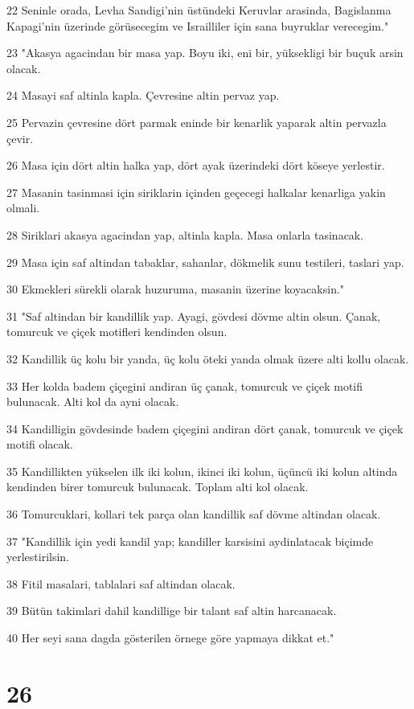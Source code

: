 \par 22 Seninle orada, Levha Sandigi'nin üstündeki Keruvlar arasinda, Bagislanma Kapagi'nin üzerinde görüsecegim ve Israilliler için sana buyruklar verecegim."
\par 23 "Akasya agacindan bir masa yap. Boyu iki, eni bir, yüksekligi bir buçuk arsin olacak.
\par 24 Masayi saf altinla kapla. Çevresine altin pervaz yap.
\par 25 Pervazin çevresine dört parmak eninde bir kenarlik yaparak altin pervazla çevir.
\par 26 Masa için dört altin halka yap, dört ayak üzerindeki dört köseye yerlestir.
\par 27 Masanin tasinmasi için siriklarin içinden geçecegi halkalar kenarliga yakin olmali.
\par 28 Siriklari akasya agacindan yap, altinla kapla. Masa onlarla tasinacak.
\par 29 Masa için saf altindan tabaklar, sahanlar, dökmelik sunu testileri, taslari yap.
\par 30 Ekmekleri sürekli olarak huzuruma, masanin üzerine koyacaksin."
\par 31 "Saf altindan bir kandillik yap. Ayagi, gövdesi dövme altin olsun. Çanak, tomurcuk ve çiçek motifleri kendinden olsun.
\par 32 Kandillik üç kolu bir yanda, üç kolu öteki yanda olmak üzere alti kollu olacak.
\par 33 Her kolda badem çiçegini andiran üç çanak, tomurcuk ve çiçek motifi bulunacak. Alti kol da ayni olacak.
\par 34 Kandilligin gövdesinde badem çiçegini andiran dört çanak, tomurcuk ve çiçek motifi olacak.
\par 35 Kandillikten yükselen ilk iki kolun, ikinci iki kolun, üçüncü iki kolun altinda kendinden birer tomurcuk bulunacak. Toplam alti kol olacak.
\par 36 Tomurcuklari, kollari tek parça olan kandillik saf dövme altindan olacak.
\par 37 "Kandillik için yedi kandil yap; kandiller karsisini aydinlatacak biçimde yerlestirilsin.
\par 38 Fitil masalari, tablalari saf altindan olacak.
\par 39 Bütün takimlari dahil kandillige bir talant saf altin harcanacak.
\par 40 Her seyi sana dagda gösterilen örnege göre yapmaya dikkat et."

\chapter{26}

